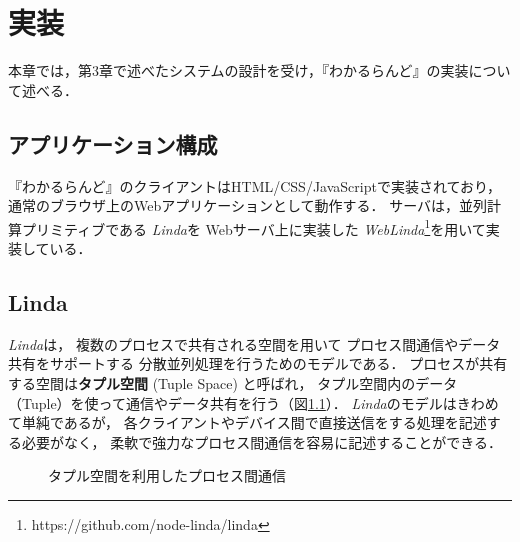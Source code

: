 \chapter{実装}
\label{chap:implementation}

本章では，第3章で述べたシステムの設計を受け，『わかるらんど』の実装について述べる．

\newpage

\section{アプリケーション構成}

『わかるらんど』のクライアントはHTML/CSS/JavaScriptで実装されており，
通常のブラウザ上のWebアプリケーションとして動作する．
サーバは，並列計算プリミティブである
\textit{Linda}\cite{Carriero:1989:LC:63334.63337}を
Webサーバ上に実装した
\textit{WebLinda}\cite{shokai_furnitue}\footnote{https://github.com/node-linda/linda}を用いて実装している．

\section{Linda}

\textit{Linda}は，
複数のプロセスで共有される空間を用いて
プロセス間通信やデータ共有をサポートする
分散並列処理を行うためのモデルである\cite{masui_linda}．
プロセスが共有する空間は\textbf{タプル空間} (Tuple Space) と呼ばれ，
タプル空間内のデータ （Tuple）を使って通信やデータ共有を行う（図\ref{linda}）．
\textit{Linda}のモデルはきわめて単純であるが，
各クライアントやデバイス間で直接送信をする処理を記述する必要がなく，
柔軟で強力なプロセス間通信を容易に記述することができる．

\begin{figure}[H]
\centering
{}
\caption{タプル空間を利用したプロセス間通信}
\label{linda}
\end{figure}


